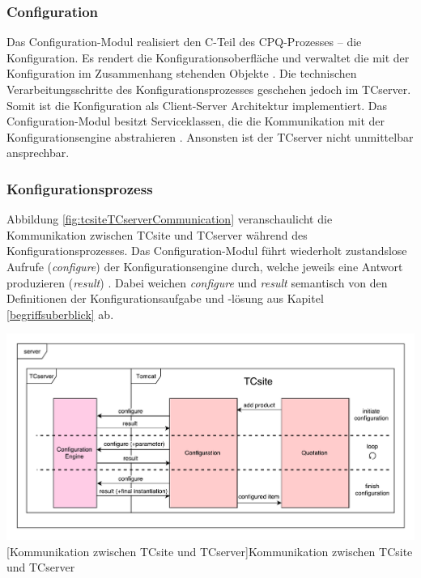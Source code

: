 \documentclass[11pt, a4paper, titlepage, listof=totoc, bibliography=totoc, index=totoc, twoside, openright, headings=normal]{scrreprt}
\begin{document}
\subsubsection*{Configuration}
Das Configuration-Modul realisiert den C-Teil des CPQ-Prozesses -- die Konfiguration. Es rendert die Konfigurationsoberfläche und verwaltet die mit der Konfiguration im Zusammenhang stehenden Objekte \citep{tactonTCsiteDevelopmentManual}. Die  technischen Verarbeitungsschritte des Konfigurationsprozesses geschehen jedoch im TCserver. Somit ist die Konfiguration als Client-Server Architektur implementiert. Das Configuration-Modul besitzt Serviceklassen, die die Kommunikation mit der Konfigurationsengine abstrahieren \citep{tactonTCsiteApiDocu}. Ansonsten ist der TCserver nicht unmittelbar ansprechbar.

\subsubsection{Konfigurationsprozess}
\label{TCsiteKonfigurationsprozess}

Abbildung \ref{fig:tcsiteTCserverCommunication} veranschaulicht die Kommunikation zwischen TCsite und TCserver während des Konfigurationsprozesses. Das Configuration-Modul führt wiederholt zustandslose Aufrufe (\emph{configure}) der Konfigurationsengine durch, welche jeweils eine Antwort produzieren (\emph{result}) \citep{tactonTCsiteDevelopmentManual}. Dabei weichen \emph{configure} und \emph{result} semantisch von den Definitionen der Konfigurationsaufgabe und -lösung aus Kapitel \ref{begriffsuberblick} ab.

\vspace{1em}
\begin{minipage}{\linewidth}
	\centering
	\includegraphics[width=1\linewidth]{Abbildungen/tcsiteTCserverCommunication.pdf}
	[Kommunikation zwischen TCsite und TCserver]{Kommunikation zwischen TCsite und TCserver}
	\label{fig:tcsiteTCserverCommunication}
\end{minipage}
\vspace{0.3em}
\end{document}

